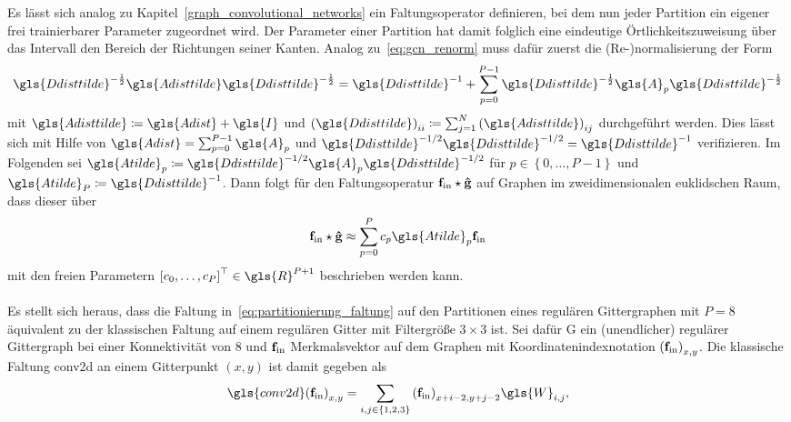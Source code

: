 Es lässt sich analog zu Kapitel~\ref{graph_convolutional_networks} ein Faltungsoperator definieren, bei dem nun jeder Partition ein eigener frei trainierbarer Parameter zugeordnet wird.
Der Parameter einer Partition hat damit folglich eine eindeutige Örtlichkeitszuweisung über das Intervall \bzw{} den Bereich der Richtungen seiner Kanten.
Analog zu~\eqref{eq:gcn_renorm} muss dafür zuerst die (Re-)normalisierung der Form
\begin{equation*}
  \gls{Ddisttilde}^{-\frac{1}{2}}\gls{Adisttilde}\gls{Ddisttilde}^{-\frac{1}{2}} = \gls{Ddisttilde}^{-1} + \sum_{p=0}^{P-1} \gls{Ddisttilde}^{-\frac{1}{2}}\gls{A}_p\gls{Ddisttilde}^{-\frac{1}{2}}
\end{equation*}
mit $\gls{Adisttilde} \coloneqq \gls{Adist} + \gls{I}$ und ${\left(\gls{Ddisttilde}\right)}_{ii} \coloneqq \sum_{j=1}^N {\left(\gls{Adisttilde}\right)}_{ij}$ durchgeführt werden.
Dies lässt sich mit Hilfe von $\gls{Adist} = \sum_{p=0}^{P-1} \gls{A}_p$ und $\gls{Ddisttilde}^{-1/2}\gls{Ddisttilde}^{-1/2} = \gls{Ddisttilde}^{-1}$ verifizieren.
Im Folgenden sei $\gls{Atilde}_p \coloneqq \gls{Ddisttilde}^{-1/2}\gls{A}_p\gls{Ddisttilde}^{-1/2}$ für $p \in \left\{0, \ldots, P-1 \right\}$ und $\gls{Atilde}_P \coloneqq \gls{Ddisttilde}^{-1}$.
Dann folgt für den Faltungsoperatur $\mathbf{f}_{\mathrm{in}} \star \mathbf{\hat g}$ auf Graphen im zweidimensionalen euklidschen Raum, dass dieser über
\begin{equation}
  \ve{f}_{\mathrm{in}} \star \ve{\hat g} \approx \sum_{p=0}^P c_p \gls{Atilde}_p \ve{f}_{\mathrm{in}}
  \label{eq:partitionierung_faltung}
\end{equation}
mit den freien Parametern ${\left[c_0, \ldots, c_P\right]}^{\top} \in \gls{R}^{P+1}$ beschrieben werden kann.
\\\\
Es stellt sich heraus, dass die Faltung in~\eqref{eq:partitionierung_faltung} auf den Partitionen eines regulären Gittergraphen mit $P=8$ äquivalent zu der klassischen Faltung auf einem regulären Gitter mit Filtergröße $3 \times 3$ ist.
Sei dafür \gls{G} ein (unendlicher) regulärer Gittergraph bei einer Konnektivität von $8$ und $\mathbf{f}_{\mathrm{in}}$ Merkmalsvektor auf dem Graphen mit Koordinatenindexnotation ${\left(\ve{f}_{\mathrm{in}}\right)}_{x,y}$.
  Die klassische Faltung \gls{conv2d} an einem Gitterpunkt $\left(x, y\right)$ ist damit gegeben als
\begin{equation*}
  {\gls{conv2d}\left({\ve{f}_{\mathrm{in}}}\right)}_{x,y} = \sum_{i,j \in \left\{1, 2, 3\right\}} {\left(\ve{f}_{\mathrm{in}}\right)}_{x+i-2, y+j-2} \gls{W}_{i, j},
\end{equation*}

